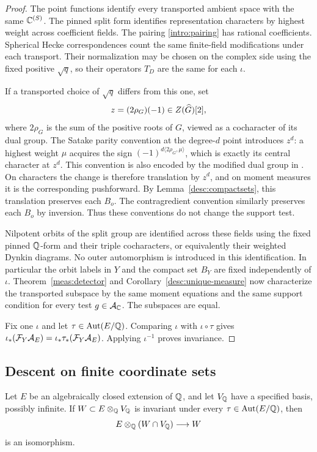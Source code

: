 \begin{proof}
The point functions identify every transported ambient space with the
same $\mathbb C^{(S)}$. The pinned split form identifies representation
characters by highest weight across coefficient fields. The pairing \eqref{intro:pairing} has rational
coefficients. Spherical Hecke correspondences count the same finite-field
modifications under each transport. Their normalization may be chosen
on the complex side using the fixed positive $\sqrt q$, so their
operators $T_D$ are the same for each $\iota$.

If a transported choice of $\sqrt q$ differs from this one, set
\[
z=(2\rho_G)(-1)\in Z(\widehat G)[2],
\]
where $2\rho_G$ is the sum of the positive roots of $G$, viewed as a
cocharacter of its dual group. The Satake parity convention at the
degree-$d$ point introduces $z^d$: a highest weight $\mu$ acquires the
sign $(-1)^{d\langle 2\rho_G,\mu\rangle}$, which is exactly its central
character at $z^d$. This convention is also encoded by the modified
dual group in \cite[Remark~6.7 and Section~6.4]{RicharzScholbach}.
On characters the change is therefore translation by $z^d$, and on
moment measures it is the corresponding pushforward. By
Lemma~\ref{desc:compactsets}, this translation preserves each $B_o$.
The contragredient convention similarly preserves each $B_o$ by
inversion. Thus these conventions do not change the support test.

Nilpotent orbits of the split group are identified across these fields
using the fixed pinned $\mathbb Q$-form and their triple cocharacters, or
equivalently their weighted Dynkin diagrams. No outer automorphism is
introduced in this identification. In particular the orbit labels in
$Y$ and the compact set
$B_Y$ are fixed independently of $\iota$. Theorem~\ref{meas:detector}
and Corollary~\ref{desc:unique-measure} now characterize the transported
subspace by the same moment equations and the same support condition
for every test $g\in\mathcal A_\mathbb C$. The subspaces are equal.

Fix one $\iota$ and let $\tau\in\operatorname{Aut}(E/\mathbb Q)$. Comparing $\iota$ with
$\iota\circ\tau$ gives
$\iota_*(\mathcal F_Y\mathcal A_E)=\iota_*\tau_*(\mathcal F_Y\mathcal A_E)$.
Applying $\iota^{-1}$ proves invariance.
\end{proof}

\subsection{Descent on finite coordinate sets}

\begin{lemma}\label{desc:descent}
Let $E$ be an algebraically closed extension of $\mathbb Q$, and let
$V_\mathbb Q$ have a specified basis, possibly infinite. If
$W\subset E\otimes_\mathbb Q V_\mathbb Q$ is invariant under every
$\tau\in\operatorname{Aut}(E/\mathbb Q)$, then
\[
E\otimes_\mathbb Q(W\cap V_\mathbb Q)\longrightarrow W
\]
is an isomorphism.
\end{lemma}

